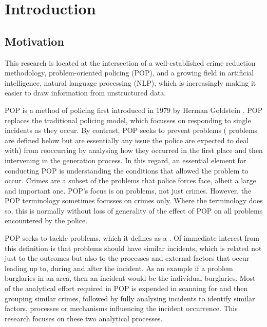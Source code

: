 \chapter{Introduction}

\section{Motivation}
This research is located at the intersection of a well-established crime reduction methodology, problem-oriented policing (POP), and a growing field in artificial intelligence, natural language processing (NLP), which is increasingly making it easier to draw information from unstructured data.

POP is a method of policing first introduced in 1979 by Herman Goldstein \parencite{gold79} . POP replaces the traditional policing model, which focusses on responding to single incidents as they occur. By contrast, POP seeks to prevent problems ( problems are defined below but are essentially any issue the police are expected to deal with) from reoccurring by analysing how they occurred in the first place and then intervening in the generation process. In this regard, an essential element for conducting POP is understanding the conditions that allowed the problem to occur. Crimes are a subset of the problems that police forces face, albeit a large and important one. POP’s focus is on problems, not just crimes. However, the POP terminology sometimes focusses on crimes only. Where the terminology does so, this is normally without loss of generality of the effect of POP on all problems encountered by the police.

POP seeks to tackle problems, which it defines as a  \parencite{popchap11}. Of immediate interest from this definition is that problems should have similar incidents, which is related not just to the outcomes but also to the processes and external factors that occur leading up to, during and after the incident.  As an example if a problem burglaries in an area, then an incident would be the individual burglaries. Most of the analytical effort required in POP is expended in scanning for and then grouping similar crimes, followed by fully analysing incidents to identify similar factors, processes or mechanisms influencing the incident occurrence. This research focuses on these two analytical processes.

